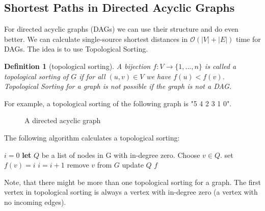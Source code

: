 \documentclass[]{article}
\newtheorem{definition}[theorem]{Definition}
\numberwithin{equation}{section}
\begin{document}
\subsection{Shortest Paths in Directed Acyclic Graphs}
\label{sec:unlabeled:dag}

For directed acyclic graphs (DAGs) we can use their structure and do even better. We can calculate single-source shortest distances in $\mathcal{O}(|V|+|E|)$ time for DAGs. The idea is to use Topological Sorting.

\begin{definition}[topological sorting]
	\label{def:topsort}
	A bijection $f : V \to \{1,...,n\}$ is called a topological sorting of $G$ if for all $(u, v) \in V$ we have $f(u) < f(v)$. Topological Sorting for a graph is not possible if the graph is not a DAG.
\end{definition}

For example, a topological sorting of the following graph is "5 4 2 3 1 0". 

\begin{figure}[H]
	\centering
	\caption{A directed acyclic graph}
	\label{fig:topsortgraph}
\end{figure}

The following algorithm calculates a topological sorting:

\begin{algorithm}[H]
	\caption{Topological Sorting in Directed Acyclic Graphs}
	\label{alg:topsort}
	\begin{algorithmic}[1]
		\State $i=0$
		\State \textbf{let} $Q$ be a list of nodes in G with in-degree zero.
		\State Choose $v\in Q$.
		\State set $f(v)=i$
		\State $i=i+1$
		\State remove $v$ from $G$
		\State update $Q$
		\EndWhile
		\State\Return $f$
		\EndProcedure
	\end{algorithmic}
\end{algorithm}

Note, that there might be more than one topological sorting for a graph. The first vertex in topological sorting is always a vertex with in-degree zero (a vertex with no incoming edges).\\
\end{document}
